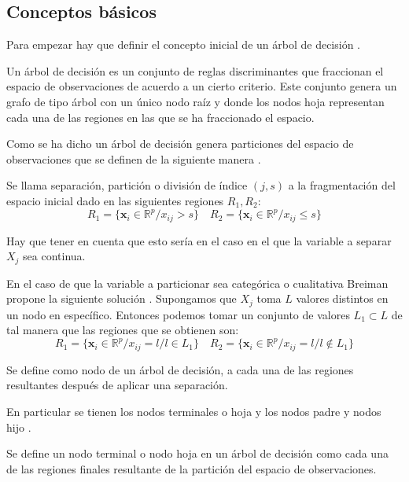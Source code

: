 \subsection{Conceptos básicos}
\noindent Para empezar hay que definir el concepto inicial de un árbol de decisión \cite{Hastie 2001}.
\begin{defi}
Un árbol de decisión es un conjunto de reglas discriminantes que fraccionan el espacio de observaciones de acuerdo a un cierto criterio. Este conjunto genera un grafo de tipo árbol con un único nodo raíz  y donde los nodos hoja representan cada una de las regiones en las que se ha fraccionado el espacio. 
\end{defi}
\noindent Como se ha dicho un árbol de decisión genera particiones del espacio de observaciones que se definen de la siguiente manera \cite{Brown 2004}.
\begin{defi}
Se llama separación, partición o división de índice $(j,s)$ a la fragmentación del espacio inicial dado en las siguientes regiones $R_1,R_2$:
\begin{equation}
R_1=\lbrace \mathbf{x}_i \in \mathbb{R}^p/ x_{ij}>s\rbrace \quad R_2=\lbrace \mathbf{x}_i \in \mathbb{R}^p/ x_{ij}\leq s\rbrace
\end{equation}

\noindent Hay que tener en cuenta que esto sería en el caso en el que la variable a separar $X_j$ sea continua.

\noindent En el caso de que la variable a particionar sea categórica o cualitativa Breiman propone la siguiente solución \cite{Breiman 1984}. Supongamos que $X_j$ toma $L$ valores distintos en un nodo en específico. Entonces podemos tomar un conjunto de valores $L_1\subset L$ de tal manera que las regiones que se obtienen son:
\begin{equation}
R_1=\lbrace \mathbf{x}_i \in \mathbb{R}^p/ x_{ij}=l/ l\in L_1\rbrace \quad R_2=\lbrace \mathbf{x}_i \in \mathbb{R}^p/ x_{ij}=l/ l\notin L_1\rbrace
\end{equation}
\end{defi}
\begin{defi}
Se define como nodo de un árbol de decisión, a cada una de las regiones resultantes después de aplicar una separación.
\end{defi}
\noindent En particular se tienen los nodos terminales o hoja y los nodos padre y nodos hijo \cite{Brown 2004}.
\begin{defi}
Se define un nodo terminal o nodo hoja en un árbol de decisión como cada una de las regiones finales resultante de la partición del espacio de observaciones.
\end{defi}
